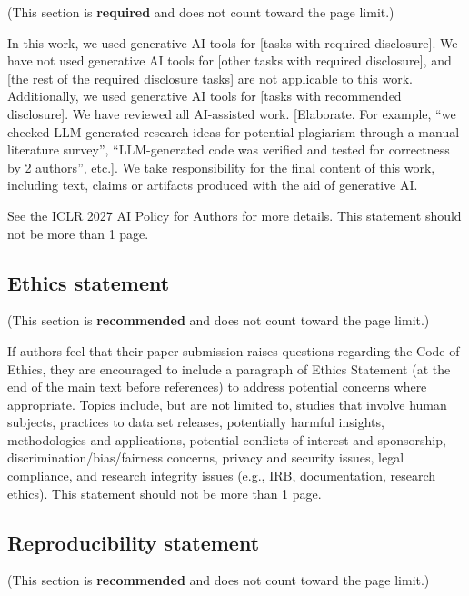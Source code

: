 \documentclass{article} %
\begin{document}
(This section is \textbf{required} and does not count toward the page limit.)

In this work, we used generative AI tools for [tasks with required disclosure].
We have not used generative AI tools for [other tasks with required disclosure],
and [the rest of the required disclosure tasks] are not applicable to this work.
Additionally, we used generative AI tools for [tasks with recommended
disclosure]. We have reviewed all AI-assisted work. [Elaborate. For example, “we
checked LLM-generated research ideas for potential plagiarism through a manual
literature survey”, “LLM-generated code was verified and tested for correctness
by 2 authors”, etc.]. We take responsibility for the final content of this work,
including text, claims or artifacts produced with the aid of generative AI.

See the ICLR 2027 AI Policy for Authors for more details. This statement should
not be more than 1 page.

\subsection*{Ethics statement}

(This section is \textbf{recommended} and does not count toward the page limit.)

If authors feel that their paper submission raises questions regarding the Code
of Ethics, they are encouraged to include a paragraph of Ethics Statement (at
the end of the main text before references) to address potential concerns where
appropriate. Topics include, but are not limited to, studies that involve human
subjects, practices to data set releases, potentially harmful insights,
methodologies and applications, potential conflicts of interest and sponsorship,
discrimination/bias/fairness concerns, privacy and security issues, legal
compliance, and research integrity issues (e.g., IRB, documentation, research
ethics). This statement should not be more than 1 page.

\subsection*{Reproducibility statement}

(This section is \textbf{recommended} and does not count toward the page limit.)
\end{document}
